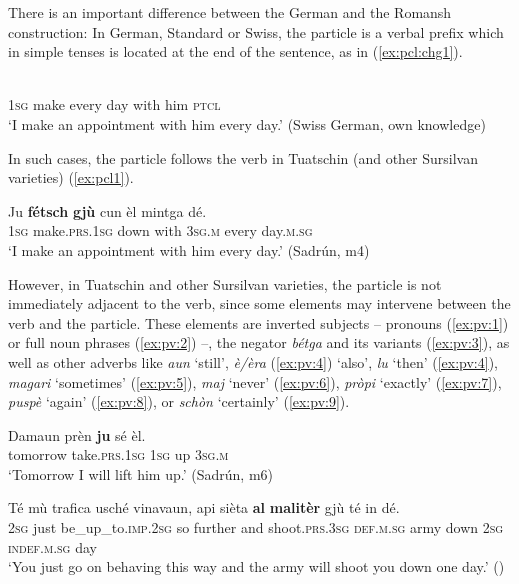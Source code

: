 There is an important difference between the German and the Romansh construction: In German, Standard or Swiss, the particle is a verbal prefix which in simple tenses is located at the end of the sentence, as in (\ref{ex:pcl:chg1}).

\ea\label{ex:pcl:chg1}
\\
     \textsc{1sg}  make every day with him  \textsc{ptcl} \\
\glt `I make an appointment with him every day.' (Swiss German, own knowledge)
\z

In such cases, the particle follows the verb in Tuatschin (and other Sursilvan varieties) (\ref{ex:pcl1}).

\ea\label{ex:pcl1}
\gll  Ju \textbf{fétsch} \textbf{gjù} cun èl mintga dé.\\
     \textsc{1sg}  make.\textsc{prs.1sg}  down with \textsc{3sg.m}  every day.\textsc{m.sg}\\
\glt `I make an appointment with him every day.' (Sadrún, m4)
\z

However, in Tuatschin and other Sursilvan varieties, the particle is not immediately adjacent to the verb, since some elements may intervene between the verb and the particle. These elements are inverted subjects -- pronouns (\ref{ex:pv:1}) or full noun phrases (\ref{ex:pv:2}) --, the negator \textit{bétga} and its variants (\ref{ex:pv:3}), as well as other adverbs like \textit{aun} `still', \textit{è/èra} (\ref{ex:pv:4}) `also', \textit{lu} `then' (\ref{ex:pv:4}), \textit{magari} `sometimes' (\ref{ex:pv:5}), \textit{maj} `never' (\ref{ex:pv:6}), \textit{pròpi} `exactly' (\ref{ex:pv:7}), \textit{puspè} `again' (\ref{ex:pv:8}), or \textit{schòn} `certainly' (\ref{ex:pv:9}).

\ea\label{ex:pv:1}
\gll   Damaun prèn \textbf{ju} sé èl.\\
     tomorrow take.\textsc{prs.1sg} \textsc{1sg} up \textsc{3sg.m}\\
\glt `Tomorrow I will lift him up.' (Sadrún, m6)
\z

\ea\label{ex:pv:2}
\gll  Té mù trafica usché vinavaun, api sièta \textbf{al} \textbf{malitèr} gjù té in dé.\\
     \textsc{2sg} just be\_up\_to.\textsc{imp.2sg} so further and shoot.\textsc{prs.3sg} \textsc{def.m.sg} army down \textsc{2sg} \textsc{indef.m.sg} day\\
\glt `You just go on behaving this way and the army will shoot you down one day.' (\citealt[91]{Gadola1935})
\z

